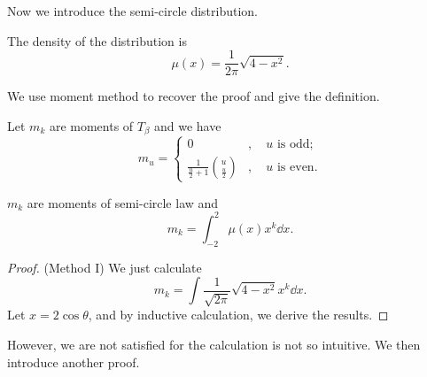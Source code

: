 Now we introduce the semi-circle distribution.
\begin{defn}
    The density of the distribution is
    \[
    \mu(x) = \frac{1}{2\pi} \sqrt{4-x^2}.
    \]
\end{defn}

We use moment method to recover the proof and give the definition.
\begin{cor}
    Let $m_k$ are moments of $T_\beta$ and we have
    \[
    m_u = \begin{cases}
        0&,\quad u \text{ is odd}; \\
        \frac{1}{\frac{u}{2}+1}\binom{u}{\frac{u}{2}} &,\quad u \text{ is even}.
    \end{cases}
    \]
\end{cor}

\begin{thm}
    \label{thm:scl}
    $m_k$ are moments of semi-circle law and
    \[
    m_k = \int_{-2}^2 \mu(x) x^k \dd x.
    \]
\end{thm}

\begin{proof}{(Method I)}
    We just calculate
    \[
    m_k = \int \frac{1}{\sqrt{2\pi}} \sqrt{4-x^2}x^k \dd x.
    \]
    Let $x = 2\cos\theta$, and by inductive calculation, we derive the results.
\end{proof}

However, we are not satisfied for the calculation is not so intuitive. We then introduce another proof.

